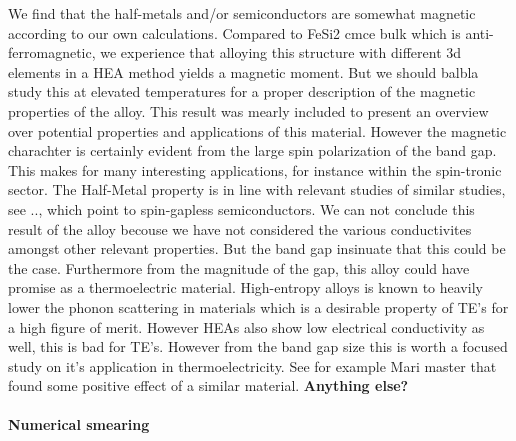  We find that the half-metals and/or semiconductors are somewhat magnetic according to our own calculations. Compared to FeSi2 cmce bulk which is anti-ferromagnetic, we experience that alloying this structure with different 3d elements in a HEA method yields a magnetic moment.  But we should balbla study this at elevated temperatures for a proper description of the magnetic properties of the alloy. This result was mearly included to present an overview over potential properties and applications of this material. However the magnetic charachter is certainly evident from the large spin polarization of the band gap. This makes for many interesting applications, for instance within the spin-tronic sector. The Half-Metal property is in line with relevant studies of similar studies, see .., which point to spin-gapless semiconductors. We can not conclude this result of the alloy becouse we have not considered the various conductivites amongst other relevant properties. But the band gap insinuate that this could be the case. Furthermore from the magnitude of the gap, this alloy could have promise as a thermoelectric material. High-entropy alloys is known to heavily lower the phonon scattering in materials which is a desirable property of TE's for a high figure of merit. However HEAs also show low electrical conductivity as well, this is bad for TE's. However from the band gap size this is worth a focused study on it's application in thermoelectricity. See for example Mari master that found some positive effect of a similar material. \textbf{Anything else?}

\paragraph{Numerical smearing \\}

